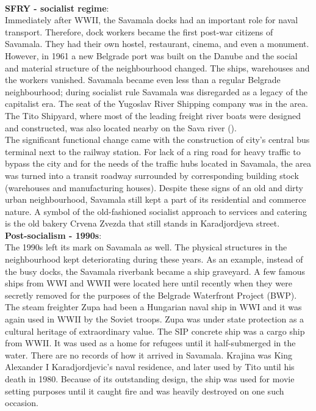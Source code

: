 \documentclass[11pt]{report}
\begin{document}
\\
\textbf{SFRY - socialist regime}:
\\
Immediately  after  WWII,  the Savamala  docks  had an  important  role  for  naval  transport.  Therefore, dock workers became the first post-war citizens of Savamala.  They had their own hostel, restaurant,  cinema,  and  even  a  monument.  However,  in  1961  a  new  Belgrade  port was built on the Danube and the social and material structure of the neighbourhood changed. The ships, warehouses and the workers vanished.  Savamala became even less than a regular  Belgrade  neighbourhood;  during   socialist  rule  Savamala  was  disregarded  as  a  legacy of the capitalist era.
The seat of the Yugoslav River Shipping company was in the area. The Tito Shipyard, where most of the leading freight river boats were designed and constructed, was also located nearby on the Sava river (\href{Markovic}{\citealt{markovic_wide_2013}}). 
\\

The significant functional change came with the construction of city’s central bus terminal next to the railway station. For lack of a ring road for heavy traffic to bypass the city and for the needs of the traffic hubs located in Savamala, the area was turned into a transit roadway  surrounded  by  corresponding building stock (warehouses and manufacturing houses). Despite  these  signs  of  an  old  and  dirty urban  neighbourhood,  Savamala  still  kept  a  part  of  its  residential  and  commerce  nature. A symbol of the old-fashioned socialist approach to services and catering is the old bakery Crvena Zvezda that still stands in Karadjordjeva street.
\\
\textbf{Post-socialism - 1990s}:
\\
The 1990s left its mark on Savamala as well. The physical structures in the neighbourhood kept deteriorating during these years. As an example, instead of the busy docks, the Savamala riverbank became a ship graveyard. A few famous ships from WWI and WWII were located here until recently when they were secretly removed for the purposes of the Belgrade Waterfront Project  (BWP).
\\

The steam freighter Zupa had been a Hungarian naval ship in WWI and it was again used in WWII by the Soviet troops. Zupa was under state protection as a cultural heritage of extraordinary value. The SIP concrete ship was a cargo ship from WWII. It was used as a home for refugees until it half-submerged in the water. There are no records of how it arrived in Savamala. Krajina was King Alexander I Karadjordjevic’s naval residence, and later used by Tito until his death in 1980. Because of its outstanding design, the ship was used for movie setting purposes until it caught fire and was heavily destroyed on one such occasion.
\\
\end{document}
